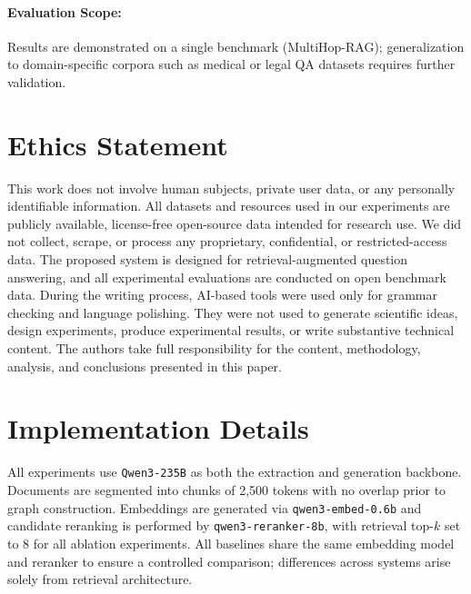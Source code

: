 \documentclass[11pt]{article}
\begin{document}
\paragraph{Evaluation Scope:} Results are demonstrated on a single benchmark (MultiHop-RAG); generalization to domain-specific corpora such as medical or legal QA datasets requires further validation.

\section{Ethics Statement}
This work does not involve human subjects, private user data, or any personally identifiable information. All datasets and resources used in our experiments are publicly available, license-free open-source data intended for research use. We did not collect, scrape, or process any proprietary, confidential, or restricted-access data. The proposed system is designed for retrieval-augmented question answering, and all experimental evaluations are conducted on open benchmark data. During the writing process, AI-based tools were used only for grammar checking and language polishing. They were not used to generate scientific ideas, design experiments, produce experimental results, or write substantive technical content. The authors take full responsibility for the content, methodology, analysis, and conclusions presented in this paper.


%




\appendix
\section{Implementation Details}
\label{app:implementation}
All experiments use \texttt{Qwen3-235B} as both the extraction and generation backbone. Documents are segmented into chunks of 2{,}500 tokens with no overlap prior to graph construction. Embeddings are generated via \texttt{qwen3-embed-0.6b} and candidate reranking is performed by \texttt{qwen3-reranker-8b}, with retrieval top-$k$ set to 8 for all ablation experiments. All baselines share the same embedding model and reranker to ensure a controlled comparison; differences across systems arise solely from retrieval architecture.
\end{document}
